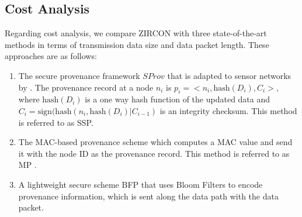\documentclass{llncs}
\begin{document}
\subsection{Cost Analysis} Regarding cost analysis, we compare ZIRCON with three state-of-the-art methods in terms of transmission data size and data packet length. These approaches are as follows: 

\begin{enumerate}
    \item The secure provenance framework $SProv$ \cite{ragib2009} that is adapted to sensor networks by \cite{Salmin2015}. The provenance record at a node $n_i$ is $p_i=<n_i, \mathrm{hash}(D_i),C_i>$, where $\mathrm{hash}(D_i)$ is a one way hash function of the updated data and $C_i = \mathrm{sign}(\mathrm{hash}(n_i,\mathrm{hash}(D_i)|C_{i-1})$ is an integrity checksum. This method is referred to as SSP. 
    \item The MAC-based provenance scheme which computes a MAC value and send it with the node ID as the provenance record. This method is referred to as MP \cite{Salmin2015}.
    \item A lightweight secure scheme BFP \cite{Salmin2015} that uses Bloom Filters to encode provenance information, which is sent along the data path with the data packet. 
\end{enumerate}
\end{document}
